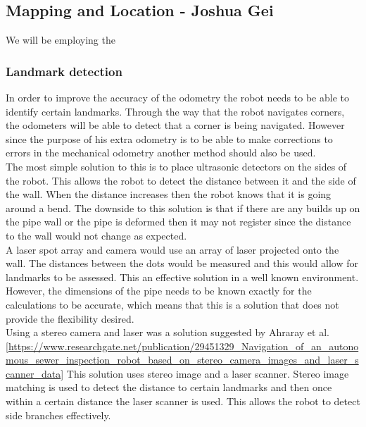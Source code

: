 \documentclass[11pt]{article}		%
\begin{document}
		\subsection[Mapping and Location]{Mapping and Location - Joshua Gei}

        We will be employing the
        
        
		
		\subsubsection{Landmark detection}
        In order to improve the accuracy of the odometry the robot needs to be able to identify certain landmarks. 
        Through the way that the robot navigates corners, the odometers will be able to detect that a corner is being navigated. 
        However since the purpose of his extra odometry is to be able to make corrections to errors in the mechanical odometry another method should also be used.
        \\
        The most simple solution to this is to place ultrasonic detectors on the sides of the robot. 
        This allows the robot to detect the distance between it and the side of the wall. 
        When the distance increases then the robot knows that it is going around a bend. 
        The downside to this solution is that if there are any builds up on the pipe wall or the pipe is deformed then it may not register since the distance to the wall would not change as expected.
        \\
        A laser spot array and camera would use an array of laser projected onto the wall. 
        The distances between the dots would be measured and this would allow for landmarks to be assessed. 
        This an effective solution in a well known environment. 
        However, the dimensions of the pipe needs to be known exactly for the calculations to be accurate, which means that this is a solution that does not provide the flexibility desired.
        \\
        Using a stereo camera and laser was a solution suggested by Ahraray et al. [\url{https://www.researchgate.net/publication/29451329_Navigation_of_an_autonomous_sewer_inspection_robot_based_on_stereo_camera_images_and_laser_scanner_data}] 
        This solution uses stereo image and a laser scanner. 
        Stereo image matching is used to detect the distance to certain landmarks and then once within a certain distance the laser scanner is used. 
        This allows the robot to detect side branches effectively. 
\end{document}
